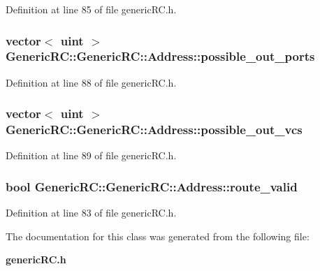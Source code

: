 Definition at line 85 of file genericRC.h.
\subsubsection[{possible\_\-out\_\-ports}]{\setlength{\rightskip}{0pt plus 5cm}vector$<$ {\bf uint} $>$ GenericRC::GenericRC::Address::possible\_\-out\_\-ports}\label{classGenericRC_1_1Address_3f839ab335b554c7e5f2f0753fc6f922}




Definition at line 88 of file genericRC.h.
\subsubsection[{possible\_\-out\_\-vcs}]{\setlength{\rightskip}{0pt plus 5cm}vector$<$ {\bf uint} $>$ GenericRC::GenericRC::Address::possible\_\-out\_\-vcs}\label{classGenericRC_1_1Address_dc675b3198b7ef2aee6fffe0fa591b3b}




Definition at line 89 of file genericRC.h.
\subsubsection[{route\_\-valid}]{\setlength{\rightskip}{0pt plus 5cm}bool GenericRC::GenericRC::Address::route\_\-valid}\label{classGenericRC_1_1Address_bcc6422d8244a1e6a0406390f842a351}




Definition at line 83 of file genericRC.h.

The documentation for this class was generated from the following file:\begin{CompactItemize}
\item 
{\bf genericRC.h}\end{CompactItemize}

